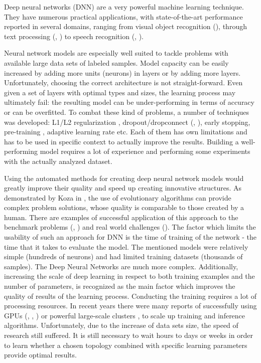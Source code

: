 \documentclass{llncs}
\begin{document}
Deep neural networks (DNN) are a very powerful machine learning technique. They have numerous practical applications, with state-of-the-art performance reported in several domains, ranging from visual object recognition (\cite{Krizhevsky2012}), through text processing (\cite{Bengio2003}, \cite{Collobert2008}) to speech recognition (\cite{Dahl2012}, \cite{Hinton2012}). 

Neural network models are especially well suited to tackle problems with available large data sets of labeled samples. Model capacity can be easily increased by adding more units (neurons) in layers or by adding more layers. Unfortunately, choosing the correct architecture is not straight-forward. Even given a set of layers with optimal types and sizes, the learning process may ultimately fail: the resulting model can be under-performing in terms of accuracy or can be overfitted. To combat these kind of problems, a number of techniques was developed: L1/L2 regularization \cite{Ng2004}, dropout/dropconnect (\cite{Srivastava2014}, \cite{Wan2013}), early stopping, pre-training \cite{Courville2010}, adaptive learning rate \cite{Cho2011} etc. Each of them has own limitations and has to be used in specific context to actually improve the results. Building a well-performing model requires a lot of experience and performing some experiments with the actually analyzed dataset.

Using the automated methods for creating deep neural network models would greatly improve their quality and speed up creating innovative structures. As demonstrated by Koza in \cite{Koza2010}, the use of evolutionary algorithms can provide complex problem solutions, whose quality is comparable to those created by a human. There are examples of successful application of this approach to the benchmark problems (\cite{Jha2016}, \cite{MohamedBenAli2008}) and real world challenges (\cite{Khan2016}). The factor which limits the usability of such an approach for DNN is the time of training of the network - the time that it takes to evaluate the model. The mentioned models were relatively simple (hundreds of neurons) and had limited training datasets (thousands of samples). The Deep Neural Networks are much more complex. Additionally, increasing the scale of deep learning in respect to both training examples and the number of parameters, is recognized as the main factor which improves the quality of results of the learning process. Conducting the training requires a lot of processing resources. In recent years there were many reports of successfully using GPUs (\cite{Krizhevsky2012}, \cite{Raina2009}, \cite{Dahl2012}) or powerful large-scale clusters \cite{Dean2012}, \cite{Le2011} to scale up training and inference algorithms. Unfortunately, due to the increase of data sets size, the speed of research still suffered. It is still necessary to wait hours to days or weeks in order to learn whether a chosen topology combined with specific learning parameters provide optimal results. 
\end{document}
